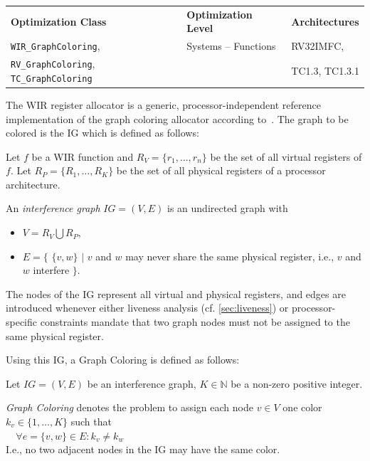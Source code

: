 \begin{tabular}{|l|l|l|}
  \hline
  \textbf{Optimization Class} & \textbf{Optimization Level} & \textbf{Architectures} \\
  \hhline{|=|=|=|}
  \texttt{WIR\_GraphColoring}, & Systems -- Functions & RV32IMFC, \\
  \texttt{RV\_GraphColoring}, \texttt{TC\_GraphColoring} & & TC1.3, TC1.3.1 \\
  \hline
\end{tabular}

The \gls{WIR} register allocator is a generic, processor-independent reference implementation of the graph coloring allocator according to~\cite{Brig92}.
The graph to be colored is the \gls{IG} which is defined as follows:

\begin{definition}[\acrlong{IG}] \label{def:igraph}
  Let $f$ be a \gls{WIR} function and $R_V = \{ r_1, \dots, r_n \}$ be the set of all virtual registers of $f$.
  Let $R_P = \{ R_1, \dots, R_K \}$ be the set of all physical registers of a processor architecture.

  An \emph{interference graph} $\textit{IG} = (V, E)$ is an undirected graph with
  \begin{itemize}
    \item $V = R_V \bigcup R_P$,
    \item $E = \{$ $\{v, w\}$ $\vert$ $v$ and $w$ may never share the same physical register, i.e., $v$ and $w$ interfere $\}$.
  \end{itemize}
\end{definition}

The nodes of the \gls{IG} represent all virtual and physical registers, and edges are introduced whenever either liveness analysis (cf. \cref{sec:liveness}) or processor-specific constraints mandate that two graph nodes must not be assigned to the same physical register.

Using this \gls{IG}, a Graph Coloring is defined as follows:
\begin{definition} \label{def:gc}
  Let $\textit{IG} = (V, E)$ be an interference graph, $K \in \mathbb{N}$ be a non-zero positive integer.

  \emph{Graph Coloring} denotes the problem to assign each node $v \in V$ one color $k_v \in \{ 1, \dots, K \}$ such that \\
  \verb|  |$\forall e = \{v, w\} \in E: k_v \not= k_w$ \\
  I.e., no two adjacent nodes in the \gls{IG} may have the same color.
\end{definition}

